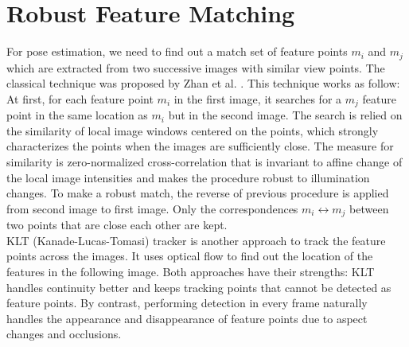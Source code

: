 \chapter{Robust Feature Matching}\label{chapter:Robust Feature Matching}
For pose estimation, we need to find out a match set of feature points ${m_i}$ and ${m_j}$ which are extracted from two successive images with similar view points. The classical technique was proposed by Zhan et al. \cite{zhang1995robust}. This technique works as follow: At first, for each feature point ${m_i}$ in the first image, it searches for a ${m_j}$ feature point in the same location as ${m_i}$ but in the second image. The search is relied on the similarity of local image windows centered on the points, which strongly characterizes the points when the images are sufficiently close. The measure for similarity is zero-normalized cross-correlation that is invariant to affine change of the local image intensities and makes the procedure robust to illumination changes. To make a robust match, the reverse of previous procedure is applied from second image to first image. Only the correspondences ${m_i} \longleftrightarrow {m_j}$ between two points that are close each other are kept.\\
KLT (Kanade-Lucas-Tomasi) tracker \cite{tomasi1991detection} \cite{shi1994good} is another approach to track the feature points across the images. It uses optical flow to find out the location of the features in the following image. Both approaches have their strengths: KLT handles continuity better and keeps tracking points that cannot be detected as feature points. By contrast, performing detection in every frame naturally handles the appearance and disappearance of feature points due to aspect changes and occlusions.

